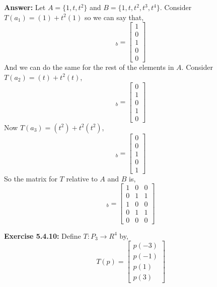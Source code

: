 \documentclass{amsart}
\begin{document}
\begin{enumerate}
\noindent \textbf{Answer: }Let $ A = \{1, t, t^2 \}$ and $B = \{ 1, t, t^2, t^3, t^4\}$. Consider $T(a_1) = (1)+t^2(1)$ so we can say that,
\begin{equation*}
[T(a_1)]_b = 
\begin{bmatrix}
1\\
0\\
1\\
0\\
0
\end{bmatrix}
\end{equation*}
And we can do the same for the rest of the elements in $A$. Consider $T(a_2) = (t) + t^2(t)$,
\begin{equation*}
[T(a_2)]_b = 
\begin{bmatrix}
0\\
1\\
0\\
1\\
0
\end{bmatrix}
\end{equation*}
Now $T(a_3) = (t^2)+t^2(t^2)$,
\begin{equation*}
[T(a_3)]_b = 
\begin{bmatrix}
0\\
0\\
1\\
0\\
1
\end{bmatrix}
\end{equation*}
So the matrix for $T$ relative to $A$ and $B$ is,
\begin{equation*}
[T(a)]_b = 
\begin{bmatrix}
1&0&0\\
0&1&1\\
1&0&0\\
0&1&1\\
0&0&0
\end{bmatrix}
\end{equation*}
\vspace{1in}

\end{enumerate}


\noindent\textbf{Exercise 5.4.10: } Define $T: P_3 \to R^4$ by,
\begin{equation*}
T(p)= 
\begin{bmatrix}
p(-3)\\
p(-1)\\
p(1)\\
p(3)
\end{bmatrix}
\end{equation*}\\
\end{document}
